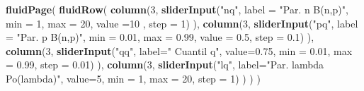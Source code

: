 \documentclass[]{book}
\newenvironment{Shaded}{\begin{snugshade}}{\end{snugshade}}
\newcommand{\DataTypeTok}[1]{\textcolor[rgb]{0.13,0.29,0.53}{#1}}
\newcommand{\DecValTok}[1]{\textcolor[rgb]{0.00,0.00,0.81}{#1}}
\newcommand{\FloatTok}[1]{\textcolor[rgb]{0.00,0.00,0.81}{#1}}
\newcommand{\KeywordTok}[1]{\textcolor[rgb]{0.13,0.29,0.53}{\textbf{#1}}}
\newcommand{\NormalTok}[1]{#1}
\newcommand{\StringTok}[1]{\textcolor[rgb]{0.31,0.60,0.02}{#1}}
\begin{document}
\begin{Shaded}
\begin{Highlighting}[]
\KeywordTok{fluidPage}\NormalTok{(}
\KeywordTok{fluidRow}\NormalTok{(}
  \KeywordTok{column}\NormalTok{(}\DecValTok{3}\NormalTok{,}
         \KeywordTok{sliderInput}\NormalTok{(}\StringTok{"nq"}\NormalTok{, }\DataTypeTok{label =} \StringTok{"Par. n B(n,p)"}\NormalTok{,}
              \DataTypeTok{min =} \DecValTok{1}\NormalTok{, }\DataTypeTok{max =} \DecValTok{20}\NormalTok{, }\DataTypeTok{value =}\DecValTok{10}\NormalTok{ , }\DataTypeTok{step =} \DecValTok{1}\NormalTok{)}
\NormalTok{         ),}
  \KeywordTok{column}\NormalTok{(}\DecValTok{3}\NormalTok{,}
          \KeywordTok{sliderInput}\NormalTok{(}\StringTok{"pq"}\NormalTok{, }\DataTypeTok{label =} \StringTok{"Par. p B(n,p)"}\NormalTok{,}
                     \DataTypeTok{min =} \FloatTok{0.01}\NormalTok{, }\DataTypeTok{max =} \FloatTok{0.99}\NormalTok{, }\DataTypeTok{value =} \FloatTok{0.5}\NormalTok{, }\DataTypeTok{step =} \FloatTok{0.1}\NormalTok{)}
\NormalTok{         ),}
  \KeywordTok{column}\NormalTok{(}\DecValTok{3}\NormalTok{,}
         \KeywordTok{sliderInput}\NormalTok{(}\StringTok{"qq"}\NormalTok{, }\DataTypeTok{label=}\StringTok{" Cuantil q"}\NormalTok{, }\DataTypeTok{value=}\FloatTok{0.75}\NormalTok{, }\DataTypeTok{min =} \FloatTok{0.01}\NormalTok{, }\DataTypeTok{max =} \FloatTok{0.99}\NormalTok{, }\DataTypeTok{step =} \FloatTok{0.01}\NormalTok{)}
\NormalTok{         ),}
  \KeywordTok{column}\NormalTok{(}\DecValTok{3}\NormalTok{,}
         \KeywordTok{sliderInput}\NormalTok{(}\StringTok{"lq"}\NormalTok{, }\DataTypeTok{label=}\StringTok{"Par. lambda Po(lambda)"}\NormalTok{, }\DataTypeTok{value=}\DecValTok{5}\NormalTok{, }\DataTypeTok{min =} \DecValTok{1}\NormalTok{, }\DataTypeTok{max =} \DecValTok{20}\NormalTok{, }\DataTypeTok{step =} \DecValTok{1}\NormalTok{)}
\NormalTok{         )}
\NormalTok{  )}
\NormalTok{)}


\end{Highlighting}
\end{Shaded}
\end{document}
